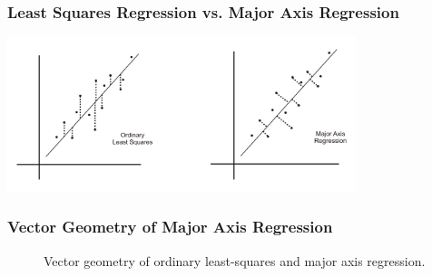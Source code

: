 \documentclass{beamer}
\begin{document}
\begin{frame}
  \frametitle{Least Squares Regression vs. Major Axis Regression}
\begin{center}
\includegraphics[width=4in]{ols_vs_majoraxis}
\end{center}
\end{frame}




\begin{frame}
  \frametitle{Vector Geometry of Major Axis Regression}

\begin{figure}
\begin{center}
\end{center}
\caption{Vector geometry of ordinary least-squares and major axis regression.}
\end{figure}


\end{frame}

\end{document}
